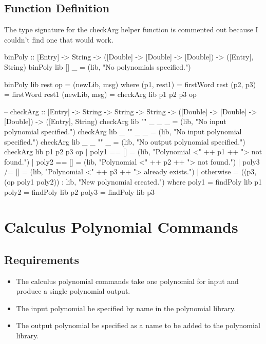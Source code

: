 \subsection{Function Definition}
The type signature for the checkArg helper function is commented out because I couldn't find one that would work.
\begin{code}
binPoly :: [Entry] -> String -> ([Double] -> [Double] -> [Double]) -> ([Entry], String)
binPoly lib [] _ = (lib, "No polynomials specified.")

binPoly lib rest op = (newLib, msg)
  where
    (p1, rest1) = firstWord rest
    (p2, p3) = firstWord rest1
    (newLib, msg) = checkArg lib p1 p2 p3 op

--    checkArg :: [Entry] -> String -> String -> String -> ([Double] -> [Double] -> [Double]) -> ([Entry], String)
    checkArg lib "" _ _ _ = (lib, "No input polynomial specified.")
    checkArg lib _ "" _ _ = (lib, "No input polynomial specified.")
    checkArg lib _ _ "" _ = (lib, "No output polynomial specified.")
    checkArg lib p1 p2 p3 op
      | poly1 == [] = (lib, "Polynomial <" ++ p1 ++ "> not found.")
      | poly2 == [] = (lib, "Polynomial <" ++ p2 ++ "> not found.")
      | poly3 /= [] = (lib, "Polynomial <" ++ p3 ++ "> already exists.")
      | otherwise   = ((p3, (op poly1 poly2)) : lib, "New polynomial created.")
      where
        poly1 = findPoly lib p1
        poly2 = findPoly lib p2
        poly3 = findPoly lib p3
\end{code}

\section{Calculus Polynomial Commands}
\subsection{Requirements}
\begin{itemize}
\item The calculus polynomial commands  take one polynomial for input and produce a single polynomial output.
\item The input polynomial  be specified by name in the polynomial library.
\item The output polynomial  be specified as a name to be added to the polynomial library.
\end{itemize}
